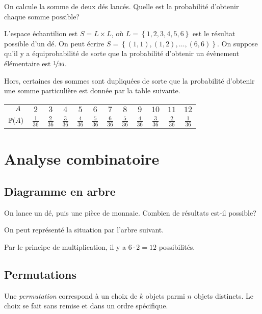 \documentclass[11pt]{article}
\renewcommand\P{%
	\ensuremath{%
		\mathbb{P}%
	}%
}%
\begin{document}
\begin{exemple}
	On calcule la somme de deux dés lancés. Quelle est la probabilité d'obtenir
	chaque somme possible?
	
	L'espace échantilion est $S=L\times L$, où $L=\left\{1,2,3,4,5,6\right\}$
	est le résultat possible d'un dé. On peut écrire
	$S=\left\{(1,1),(1,2),\dots,(6,6)\right\}$. On suppose qu'il y a
	équiprobabilité de sorte que la probabilité d'obtenir un évènement
	élémentaire est $\nicefrac{1}{36}$.

	Hors, certaines des sommes sont dupliquées de sorte que la probabilité
	d'obtenir une somme particulière est donnée par la table suivante.
	\begin{table}[H]
		\centering
		\begin{tabular}{r|ccccccccccc}
			$\phantom{\P(}A\phantom{)}$ &
			$2$ & $3$ & $4$ & $5$ & $6$ & $7$ & $8$ & $9$ & $10$ & $11$ & $12$\\
			$\P(A)$ &
			$\frac{1}{36}$ & $\frac{2}{36}$ & $\frac{3}{36}$ & $\frac{4}{36}$ &
			$\frac{5}{36}$ & $\frac{6}{36}$ & $\frac{5}{36}$ & $\frac{4}{36}$ &
			$\frac{3}{36}$ & $\frac{2}{36}$ & $\frac{1}{36}$\\
		\end{tabular}
	\end{table}
\end{exemple}

\section{Analyse combinatoire}
\subsection{Diagramme en arbre}

\begin{exemple}
	On lance un dé, puis une pièce de monnaie. Combien de résultats est-il
	possible?
	
	On peut représenté la situation par l'arbre suivant.
	\begin{figure}[H]
		\centering
		
	\end{figure}
	Par le principe de multiplication, il y a $6\cdot 2=12$ possibilités.
\end{exemple}

\subsection{Permutations}
\begin{definition}
	Une \textit{permutation} correspond à un choix de $k$ objets parmi $n$
	objets distincts. Le choix se fait sans remise et dans un ordre spécifique.
\end{definition}
\end{document}
